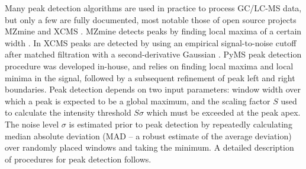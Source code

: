 Many peak detection algorithms are used in practice to process GC/LC-MS data,
but only a few are fully documented, most notable those of open source
projects MZmine \cite{katajamaa06} and XCMS \cite{smith06}.  MZmine detects
peaks by finding local maxima of a certain width \cite{katajamaa06}. In XCMS
peaks are detected by using an empirical signal-to-noise cutoff after matched
filtration with a second-derivative Gaussian \cite{smith06}. PyMS peak
detection procedure was developed in-house, and relies on finding local
maxima and local minima in the signal, followed by a subsequent refinement
of peak left and right boundaries. Peak detection depends on two input
parameters: window width over which a peak is expected to be a global maximum,
and the scaling factor $S$ used to calculate the intensity threshold $S
\sigma$ which must be exceeded at the peak apex. The noise level $\sigma$
is estimated prior to peak detection by repeatedly calculating median
absolute deviation (MAD -- a robust estimate of the average deviation) over
randomly placed windows and taking the minimum. A detailed description of
procedures for peak detection follows. 

